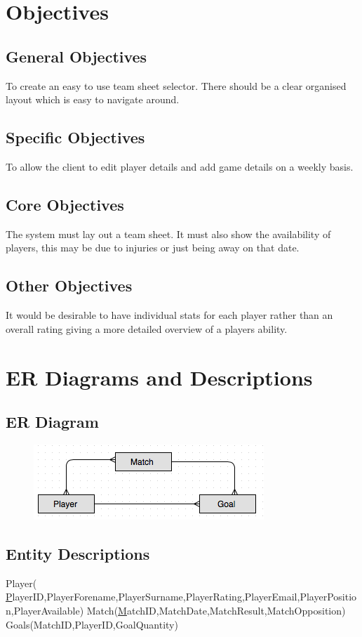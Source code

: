 \section{Objectives}

\subsection{General Objectives}
To create an easy to use team sheet selector. There should be a clear organised layout which is easy to navigate around. 
\subsection{Specific Objectives}
To allow the client to edit player details and add game details on a weekly basis.
\subsection{Core Objectives}
The system must lay out a team sheet. It must also show the availability of players, this may be due to injuries or just being away on that date.     
\subsection{Other Objectives}
It would be desirable to have individual stats for each player rather than an overall rating giving a more detailed overview of a players ability.
\section{ER Diagrams and Descriptions}

\subsection{ER Diagram}
\begin{figure}[H]
	\includegraphics{ER}
\end{figure}

\subsection{Entity Descriptions}
Player( {\ul PlayerID},PlayerForename,PlayerSurname,PlayerRating,PlayerEmail,PlayerPosition,PlayerAvailable)
Match({\ul MatchID},MatchDate,MatchResult,MatchOpposition)
Goals(MatchID,PlayerID,GoalQuantity)
